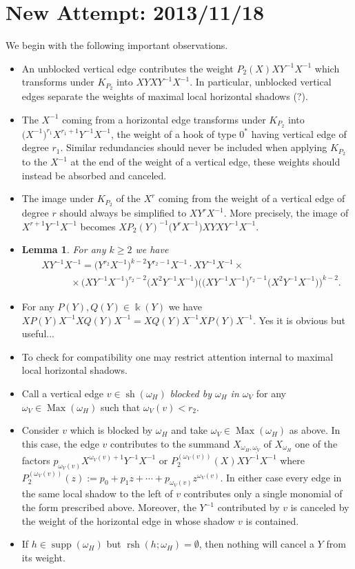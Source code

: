 \documentclass{amsart}
\newtheorem{lemma}[theorem]{Lemma}
\newcommand{\kk}{\Bbbk}
\newcommand{\supp}{\operatorname{supp}}
\newcommand{\Max}{\operatorname{Max}}
\newcommand{\rsh}{\operatorname{rsh}}
\newcommand{\sh}{\operatorname{sh}}
\begin{document}
\section{New Attempt: 2013/11/18}
 We begin with the following important observations.
 \begin{itemize}
  \item An unblocked vertical edge contributes the weight $P_2(X)XY^{-1}X^{-1}$ which transforms under $K_{P_2}$ into $XYXY^{-1}X^{-1}$.  In particular, unblocked vertical edges separate the weights of maximal local horizontal shadows (?).
  \item The $X^{-1}$ coming from a horizontal edge transforms under $K_{P_2}$ into $\big(X^{-1}\big)^{r_1}X^{r_1+1}Y^{-1}X^{-1}$, the weight of a hook of type $0^*$ having vertical edge of degree $r_1$.  Similar redundancies should never be included when applying $K_{P_2}$ to the $X^{-1}$ at the end of the weight of a vertical edge, these weights should instead be absorbed and canceled.
  \item The image under $K_{P_2}$ of the $X^r$ coming from the weight of a vertical edge of degree $r$ should always be simplified to $XY^rX^{-1}$.  More precisely, the image of $X^{r+1}Y^{-1}X^{-1}$ becomes $XP_2(Y)^{-1}\big(Y^rX^{-1}\big)XYXY^{-1}X^{-1}$.
  \item 
  \begin{lemma}
  \label{le:expansion}
   For any $k\ge2$ we have
   \begin{align*}
    &XY^{-1}X^{-1}=\Big(Y^{r_2}X^{-1}\Big)^{k-2}Y^{r_2-1}X^{-1}\cdot XY^{-1}X^{-1}\times\\
    &\quad\quad\quad\times\Big(XY^{-1}X^{-1}\Big)^{r_2-2}\Big(X^2Y^{-1}X^{-1}\Big)\bigg(\Big(XY^{-1}X^{-1}\Big)^{r_2-1}\Big(X^2Y^{-1}X^{-1}\Big)\bigg)^{k-2}.
   \end{align*}
  \end{lemma}
  \item For any $P(Y),Q(Y)\in\kk(Y)$ we have $XP(Y)X^{-1}XQ(Y)X^{-1}=XQ(Y)X^{-1}XP(Y)X^{-1}$.  Yes it is obvious but useful...
  \item To check for compatibility one may restrict attention internal to maximal local horizontal shadows.
  \item Call a vertical edge $v\in\sh(\omega_H)$ \emph{blocked by $\omega_H$ in $\omega_V$} for any $\omega_V\in\Max(\omega_H)$ such that $\omega_V(v)<r_2$.  
  \item Consider $v$ which is blocked by $\omega_H$ and take $\omega_V\in\Max(\omega_H)$ as above.  In this case, the edge $v$ contributes to the summand $X_{\omega_H,\underline{\omega_V}}$ of $X_{\omega_H}$ one of the factors $p_{\omega_V(v)}X^{\omega_V(v)+1}Y^{-1}X^{-1}$ or $P_2^{(\omega_V(v))}(X)XY^{-1}X^{-1}$ where $P_2^{(\omega_V(v))}(z):=p_0+p_1z+\cdots+p_{\omega_V(v)}z^{\omega_V(v)}$.  In either case every edge in the same local shadow to the left of $v$ contributes only a single monomial of the form prescribed above.  Moreover, the $Y^{-1}$ contributed by $v$ is canceled by the weight of the horizontal edge in whose shadow $v$ is contained.
  \item If $h\in\supp(\omega_H)$ but $\rsh(h;\omega_H)=\emptyset$, then nothing will cancel a $Y$ from its weight.
 \end{itemize} 
 
\end{document}
